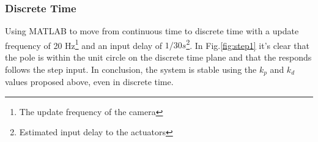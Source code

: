 \subsubsection{Discrete Time}
Using MATLAB to move from continuous time to discrete time with a update frequency of 20 Hz\footnote{The update frequency of the camera} and an input delay of $1/30s$\footnote{Estimated input delay to the actuators}. In Fig.\ref{fig:step1} it's clear that the pole is within the unit circle on the discrete time plane and that the responds follows the step input. In conclusion, the system is stable using the $k_p$ and $k_d$ values proposed above, even in discrete time.
